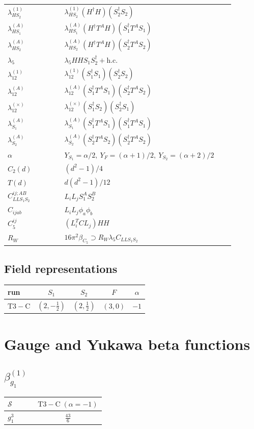 \documentclass[9pt]{article}
\begin{document}
\begin{longtable}{@{}p{0.23\linewidth}p{0.69\linewidth}@{}}
$\lambda_{HS_2}^{(1)}$ & $\lambda_{HS_2}^{(1)}(H^\dagger H)(S_2^\dagger S_2)$ \\
$\lambda_{HS_1}^{(A)}$ & $\lambda_{HS_1}^{(A)}(H^\dagger T^AH)(S_1^\dagger T^AS_1)$ \\
$\lambda_{HS_2}^{(A)}$ & $\lambda_{HS_2}^{(A)}(H^\dagger T^AH)(S_2^\dagger T^AS_2)$ \\
$\lambda_5$ & $\lambda_5HHS_1S_2^\dagger+\mathrm{h.c.}$ \\
$\lambda_{12}^{(1)}$ & $\lambda_{12}^{(1)}(S_1^\dagger S_1)(S_2^\dagger S_2)$ \\
$\lambda_{12}^{(A)}$ & $\lambda_{12}^{(A)}(S_1^\dagger T^AS_1)(S_2^\dagger T^AS_2)$ \\
$\lambda_{12}^{(\times)}$ & $\lambda_{12}^{(\times)}(S_1^\dagger S_2)(S_2^\dagger S_1)$ \\
$\lambda_{S_1}^{(A)}$ & $\lambda_{S_1}^{(A)}(S_1^\dagger T^A S_1)(S_1^\dagger T^A S_1)$ \\
$\lambda_{S_2}^{(A)}$ & $\lambda_{S_2}^{(A)}(S_2^\dagger T^A S_2)(S_2^\dagger T^A S_2)$ \\
$\alpha$ & $Y_{S_1}=\alpha/2,\ Y_F=(\alpha+1)/2,\ Y_{S_2}=(\alpha+2)/2$ \\
$C_2(d)$ & $(d^2-1)/4$ \\
$T(d)$ & $d(d^2-1)/12$ \\
$C_{LLS_1S_2}^{ij;AB}$ & $L_iL_jS_1^AS_2^B$ \\
$C_{ijab}$ & $L_iL_j\phi_a\phi_b$ \\
$C_5^{ij}$ & $(L_i^TCL_j)HH$ \\
$R_W$ & $16\pi^2\beta_{C_5}\supset R_W\lambda_5C_{LLS_1S_2}$ \\
\bottomrule
\end{longtable}
\subsection*{Field representations}
\begin{longtable}{@{}lcccc@{}}
\toprule
run & $S_1$ & $S_2$ & $F$ & $\alpha$ \\
\midrule
$\mathrm{T3-C}$ & $(2,- \frac{1}{2})$ & $(2,\frac{1}{2})$ & $(3,0)$ & $-1$ \\
\bottomrule
\end{longtable}
\section*{Gauge and Yukawa beta functions}
\subsection*{$ \beta_{g_1}^{(1)} $}
\begin{longtable}{@{}p{0.38\linewidth}c@{}}
\toprule
$\mathcal{S}$ & $ \mathrm{T3-C}\;(\alpha=-1) $ \\
\midrule
$ g_1^3 $ & $ \frac{43}{6} $ \\
\bottomrule
\end{longtable}
\end{document}
